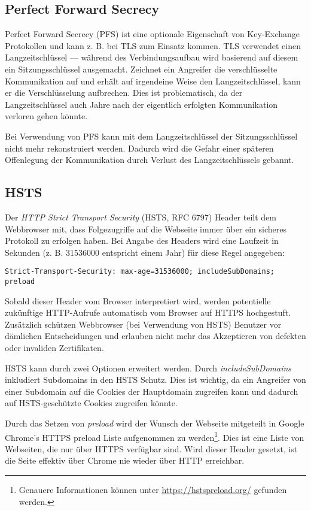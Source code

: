 \subsection{Perfect Forward Secrecy}

Perfect Forward Secrecy (PFS) ist eine optionale Eigenschaft von Key-Exchange Protokollen und kann z. B. bei TLS zum Einsatz kommen. TLS verwendet einen Langzeitschlüssel --- während des Verbindungsaufbau wird basierend auf diesem ein Sitzungsschlüssel ausgemacht. Zeichnet ein Angreifer die verschlüsselte Kommunikation auf und erhält auf irgendeine Weise den Langzeitschlüssel, kann er die Verschlüsselung aufbrechen. Dies ist problematisch, da der Langzeitschlüssel auch Jahre nach der eigentlich erfolgten Kommunikation verloren gehen könnte.

Bei Verwendung von PFS kann mit dem Langzeitschlüssel der Sitzungsschlüssel nicht mehr rekonstruiert werden. Dadurch wird die Gefahr einer späteren Offenlegung der Kommunikation durch Verlust des Langzeitschlüssels gebannt.

\subsection{HSTS}
\label{hsts}

Der \textit{HTTP Strict Transport Security} (HSTS, RFC 6797) Header teilt dem Webbrowser mit, dass Folgezugriffe auf die Webseite immer über ein sicheres Protokoll zu erfolgen haben. Bei Angabe des Headers wird eine Laufzeit in Sekunden (z. B. 31536000 entspricht einem Jahr) für diese Regel angegeben:

\begin{verbatim}
Strict-Transport-Security: max-age=31536000; includeSubDomains; preload
\end{verbatim}

Sobald dieser Header vom Browser interpretiert wird, werden potentielle zukünftige HTTP-Aufrufe automatisch vom Browser auf HTTPS hochgestuft. Zusätzlich schützen Webbrowser (bei Verwendung von HSTS) Benutzer vor dämlichen Entscheidungen und erlauben nicht mehr das Akzeptieren von defekten oder invaliden Zertifikaten.

HSTS kann durch zwei Optionen erweitert werden. Durch \textit{includeSubDomains} inkludiert Subdomains in den HSTS Schutz. Dies ist wichtig, da ein Angreifer von einer Subdomain auf die Cookies der Hauptdomain zugreifen kann und dadurch auf HSTS-geschützte Cookies zugreifen könnte.

Durch das Setzen von \textit{preload} wird der Wunsch der Webseite mitgeteilt in Google Chrome's HTTPS preload Liste aufgenommen zu werden\footnote{Genauere Informationen können unter \url{https://hstspreload.org/} gefunden werden.}. Dies ist eine Liste von Webseiten, die nur über HTTPS verfügbar sind. Wird dieser Header gesetzt, ist die Seite effektiv über Chrome nie wieder über HTTP erreichbar.

